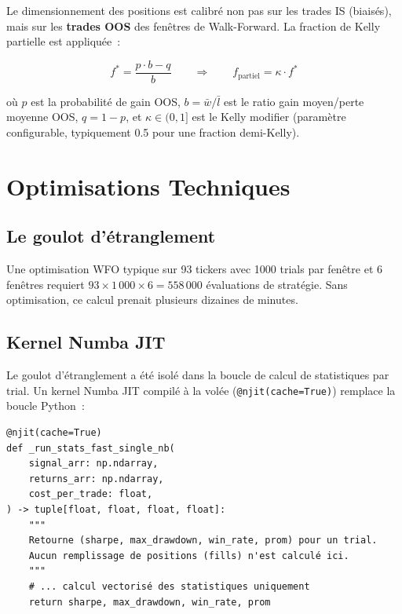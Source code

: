 Le dimensionnement des positions est calibré non pas sur les trades IS (biaisés),
mais sur les \textbf{trades OOS} des fenêtres de Walk-Forward. La fraction de Kelly
partielle est appliquée~:

\begin{equation}
f^* = \frac{p \cdot b - q}{b}
\qquad \Rightarrow \qquad f_{\text{partiel}} = \kappa \cdot f^*
\label{eq:kelly}
\end{equation}

où $p$ est la probabilité de gain OOS, $b = \bar{w}/\bar{l}$ est le ratio
gain moyen/perte moyenne OOS, $q = 1-p$, et $\kappa \in (0,1]$ est le
Kelly modifier (paramètre configurable, typiquement 0.5 pour une fraction
demi-Kelly).

\section{Optimisations Techniques}
\label{sec:optim_perf}

\subsection{Le goulot d'étranglement}

Une optimisation WFO typique sur 93 tickers avec 1000 trials par fenêtre et
6 fenêtres requiert $93 \times 1\,000 \times 6 = 558\,000$ évaluations de
stratégie. Sans optimisation, ce calcul prenait plusieurs dizaines de minutes.

\subsection{Kernel Numba JIT}

Le goulot d'étranglement a été isolé dans la boucle de calcul de statistiques
par trial. Un kernel Numba JIT compilé à la volée (\texttt{@njit(cache=True)})
remplace la boucle Python~:

\begin{lstlisting}[caption={Kernel Numba JIT pour le calcul de métriques par trial},label={lst:numba_kernel}]
@njit(cache=True)
def _run_stats_fast_single_nb(
    signal_arr: np.ndarray,
    returns_arr: np.ndarray,
    cost_per_trade: float,
) -> tuple[float, float, float, float]:
    """
    Retourne (sharpe, max_drawdown, win_rate, prom) pour un trial.
    Aucun remplissage de positions (fills) n'est calculé ici.
    """
    # ... calcul vectorisé des statistiques uniquement
    return sharpe, max_drawdown, win_rate, prom
\end{lstlisting}

